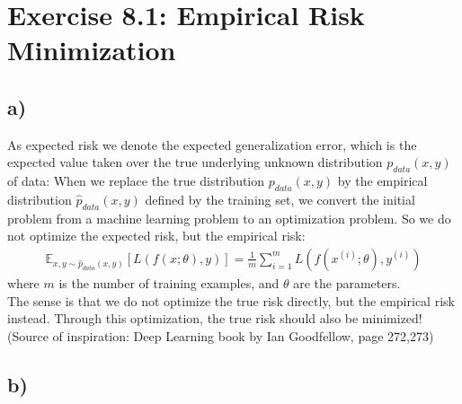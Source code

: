 \documentclass[a4paper]{article}
\begin{document}





\section*{Exercise 8.1: Empirical Risk Minimization}
    \subsection*{a)}
        As expected risk we denote the expected generalization error, which is the expected value taken over the true underlying unknown distribution $p_{data}(x,y)$ of data:
        When we replace the true distribution $p_{data}(x,y)$ by the empirical distribution $\hat{p}_{data}(x,y)$ defined by the training set, we convert the initial problem from a machine learning problem to an optimization problem.
        So we do not optimize the expected risk, but the empirical risk:
        \begin{align}
            \mathbb{E}_{x,y \sim \hat{p}_{data}(x,y)}[L(f(x;\theta),y)] = \frac{1}{m} \sum\limits_{i=1}^m L(f(x^{(i)};\theta),y^{(i)})
        \end{align}
        where $m$ is the number of training examples, and $\theta$ are the parameters.\\
        The sense is that we do not optimize the true risk directly, but the empirical risk instead.
        Through this optimization, the true risk should also be minimized!\\
        (Source of inspiration: Deep Learning book by Ian Goodfellow, page 272,273)


    \subsection*{b)}
        
\end{document}

